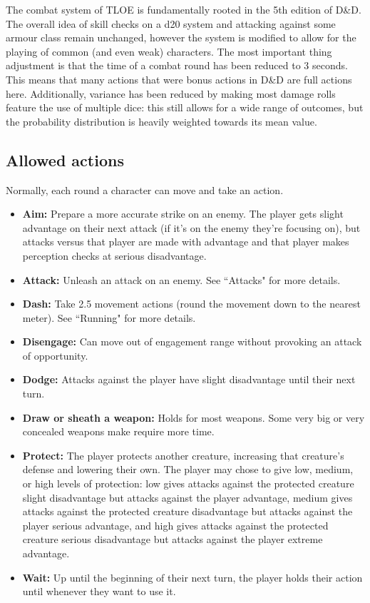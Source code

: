 \documentclass[letterpaper,12pt]{article}
\begin{document}
The combat system of TLOE is fundamentally rooted in the 5th edition of D\&D. The overall idea of skill checks on a d20 system and attacking against some armour class remain unchanged, however the system is modified to allow for the playing of common (and even weak) characters. The most important thing adjustment is that the time of a combat round has been reduced to 3 seconds. This means that many actions that were bonus actions in D\&D are full actions here. Additionally, variance has been reduced by making most damage rolls feature the use of multiple dice: this still allows for a wide range of outcomes, but the probability distribution is heavily weighted towards its mean value. 

\subsection{Allowed actions}

Normally, each round a character can move and take an action.

\begin{itemize}
\item \textbf{Aim:} Prepare a more accurate strike on an enemy. The player gets slight advantage on their next attack (if it's on the enemy they're focusing on), but attacks versus that player are made with advantage and that player makes perception checks at serious disadvantage.
\item \textbf{Attack:} Unleash an attack on an enemy. See ``Attacks" for more details.
\item \textbf{Dash:} Take 2.5 movement actions (round the movement down to the nearest meter). See ``Running" for more details.
\item \textbf{Disengage:} Can move out of engagement range without provoking an attack of opportunity.
\item \textbf{Dodge:} Attacks against the player have slight disadvantage until their next turn.
\item \textbf{Draw or sheath a weapon:} Holds for most weapons. Some very big or very concealed weapons make require more time. 
\item \textbf{Protect:} The player protects another creature, increasing that creature's defense and lowering their own. The player may chose to give low, medium, or high levels of protection: low gives attacks against the protected creature slight disadvantage but attacks against the player advantage, medium gives attacks against the protected creature disadvantage but attacks against the player serious advantage, and high gives attacks against the protected creature serious disadvantage but attacks against the player extreme advantage. 
\item \textbf{Wait:} Up until the beginning of their next turn, the player holds their action until whenever they want to use it.
\end{itemize}
\end{document}
